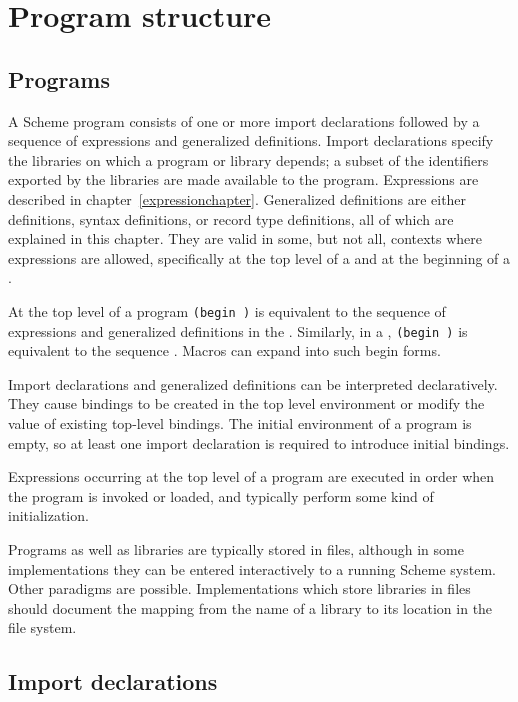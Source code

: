 \chapter{Program structure}
\label{programchapter}

\section{Programs}

A Scheme program consists of  
one or more import declarations followed by a sequence of
expressions and generalized definitions.
Import declarations specify the libraries on which a program or library depends;
a subset of the identifiers exported by the libraries are made available to
the program.
Expressions are described in chapter~\ref{expressionchapter}.
Generalized definitions are either definitions, syntax definitions, or
record type definitions, all of which are explained in this chapter.
They are valid in some, but not all, contexts where expressions
are allowed, specifically at the top level of a 
and at the beginning of a .

At the top level of a program {\tt(begin  \dotsfoo)} is
equivalent to the sequence of expressions and generalized definitions
in the .   
Similarly, in a , {\tt(begin  \dotsfoo)} is equivalent
to the sequence  \dotsfoo.
Macros can expand into such {\cf begin} forms.

Import declarations and generalized definitions can be interpreted declaratively.
They cause bindings to be created in the top level
environment or modify the value of existing top-level bindings.
The initial environment of a program is empty,
so at least one import declaration is required to introduce initial bindings.

Expressions occurring at the top level of a program are
executed in order when the program is
invoked or loaded, and typically perform some kind of initialization.


Programs as well as libraries are typically stored in files, although
in some implementations they can be entered interactively to a running
Scheme system.  Other paradigms are possible.
Implementations which store libraries in files should document the
mapping from the name of a library to its location in the file system.

\section{Import declarations}

